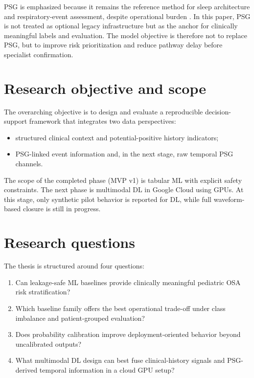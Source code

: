 \documentclass[10pt,a4paper,twocolumn]{article}
\begin{document}
PSG is emphasized because it remains the reference method for sleep architecture and respiratory-event assessment, despite operational burden \citep{berry2023,rundo2019}. In this paper, PSG is not treated as optional legacy infrastructure but as the anchor for clinically meaningful labels and evaluation. The model objective is therefore not to replace PSG, but to improve risk prioritization and reduce pathway delay before specialist confirmation.

\section{Research objective and scope}
The overarching objective is to design and evaluate a reproducible decision-support framework that integrates two data perspectives:
\begin{itemize}[leftmargin=1.2cm]
    \item structured clinical context and potential-positive history indicators;
    \item PSG-linked event information and, in the next stage, raw temporal PSG channels.
\end{itemize}

The scope of the completed phase (MVP v1) is tabular ML with explicit safety constraints. The next phase is multimodal DL in Google Cloud using GPUs. At this stage, only synthetic pilot behavior is reported for DL, while full waveform-based closure is still in progress.

\section{Research questions}
The thesis is structured around four questions:
\begin{enumerate}[leftmargin=1.2cm]
    \item Can leakage-safe ML baselines provide clinically meaningful pediatric OSA risk stratification?
    \item Which baseline family offers the best operational trade-off under class imbalance and patient-grouped evaluation?
    \item Does probability calibration improve deployment-oriented behavior beyond uncalibrated outputs?
    \item What multimodal DL design can best fuse clinical-history signals and PSG-derived temporal information in a cloud GPU setup?
\end{enumerate}
\end{document}

